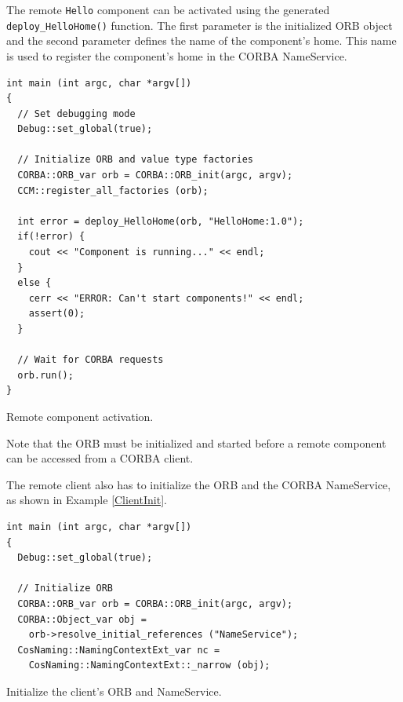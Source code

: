 \noindent
The remote {\tt Hello} component can be activated using the generated {\tt deploy\_HelloHome()} 
function. The first parameter is the initialized ORB object and the second parameter
defines the name of the component's home. This name is used to register the component's
home in the CORBA NameService. 
\begin{Example}
\begin{minifbox}
\begin{small}
\begin{verbatim}
int main (int argc, char *argv[])
{
  // Set debugging mode
  Debug::set_global(true); 

  // Initialize ORB and value type factories
  CORBA::ORB_var orb = CORBA::ORB_init(argc, argv);
  CCM::register_all_factories (orb);

  int error = deploy_HelloHome(orb, "HelloHome:1.0");
  if(!error) {
    cout << "Component is running..." << endl;
  }
  else {
    cerr << "ERROR: Can't start components!" << endl;
    assert(0);
  }

  // Wait for CORBA requests
  orb.run();
}
\end{verbatim}
\end{small}
\end{minifbox}
\caption{Remote component activation.}
\label{RemoteComponentServer}
\end{Example}

\noindent
Note that the ORB must be initialized and started before a remote component
can be accessed from a CORBA client.

\noindent
The remote client also has to initialize the ORB and the CORBA NameService,
as shown in Example \ref{ClientInit}.
\begin{Example}
\begin{minifbox}
\begin{small}
\begin{verbatim}
int main (int argc, char *argv[])
{
  Debug::set_global(true); 

  // Initialize ORB 
  CORBA::ORB_var orb = CORBA::ORB_init(argc, argv);
  CORBA::Object_var obj = 
    orb->resolve_initial_references ("NameService");
  CosNaming::NamingContextExt_var nc = 
    CosNaming::NamingContextExt::_narrow (obj);
\end{verbatim}
\end{small}
\end{minifbox}
\caption{Initialize the client's ORB and NameService.}
\label{ClientInit}
\end{Example}

